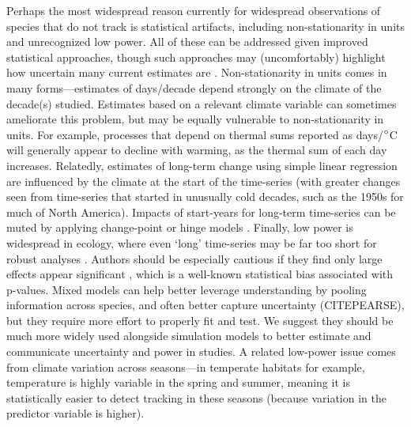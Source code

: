 \documentclass[11pt,letterpaper]{article}
\begin{document}
Perhaps the most widespread reason currently for widespread observations of species that do not track is statistical artifacts, including non-stationarity in units and unrecognized low power. All of these can be addressed given improved statistical approaches, though such approaches may (uncomfortably) highlight how uncertain many current estimates are \citep{brown2016}. Non-stationarity in units comes in many forms---estimates of days/decade depend strongly on the climate of the decade(s) studied. Estimates based on a relevant climate variable can sometimes ameliorate this problem, but may be equally vulnerable to non-stationarity in units. For example, processes that depend on thermal sums reported as days/$\degree$C will generally appear to decline with warming, as the thermal sum of each day increases. Relatedly, estimates of long-term change using simple linear regression are influenced by the climate at the start of the time-series (with greater changes seen from time-series that started in unusually cold decades, such as the 1950s for much of North America). Impacts of start-years for long-term time-series can be muted by applying change-point or hinge models \citep[e.g.,][]{kharouba2018}. Finally, low power is widespread in ecology, where even `long' time-series may be far too short for robust analyses \citep{bolmgren2013,kharouba2018}. Authors should be especially cautious if they find only large effects appear significant \citep[e.g.,][]{CaraDonna2014}, which is a well-known statistical bias associated with p-values. Mixed models can help better leverage understanding by pooling information across species, and often better capture uncertainty (CITEPEARSE), but they require more effort to properly fit and test. We suggest they should be much more widely used alongside simulation models to better estimate and communicate uncertainty and power in studies. A related low-power issue comes from climate variation across seasons---in temperate habitats for example, temperature is highly variable in the spring and summer, meaning it is statistically easier to detect tracking in these seasons (because variation in the predictor variable is higher). %





\end{document}
